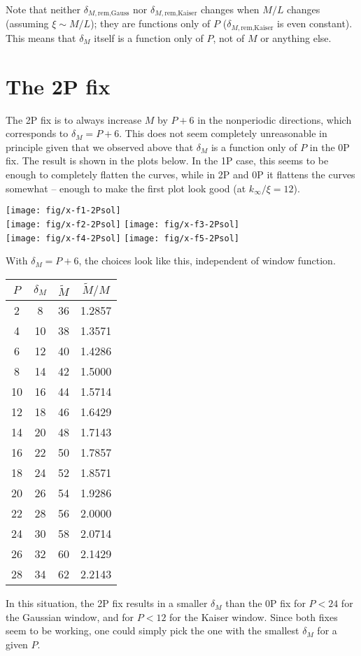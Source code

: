 \documentclass[a4paper,10pt]{article}
\begin{document}
Note that neither $\delta_{M,\text{rem,Gauss}}$ nor
$\delta_{M,\text{rem,Kaiser}}$ changes when $M/L$ changes
(assuming $\xi \sim M/L$); they are functions only of $P$
($\delta_{M,\text{rem,Kaiser}}$ is even constant). This means
that $\delta_M$ itself is a function only of $P$, not of $M$ or
anything else.

\section{The 2P fix}

The 2P fix is to always increase $M$ by $P+6$ in the nonperiodic
directions, which corresponds to $\delta_M = P+6$. This does not
seem completely unreasonable in principle given that we observed
above that $\delta_M$ is a function only of $P$ in the 0P fix.
The result is shown in the plots below. In the 1P case, this
seems to be enough to completely flatten the curves, while in 2P
and 0P it flattens the curves somewhat -- enough to make the
first plot look good (at $k_\infty/\xi=12$).

{\noindent\centering
\texttt{[image: fig/x-f1-2Psol]}\\%
\texttt{[image: fig/x-f2-2Psol]}%
\texttt{[image: fig/x-f3-2Psol]}\\%
\texttt{[image: fig/x-f4-2Psol]}%
\texttt{[image: fig/x-f5-2Psol]}}

With $\delta_M=P+6$, the choices look like this, independent of
window function.
\begin{center}
  \begin{tabular}{cccc}
    \toprule
    $P$ & $\delta_M$ & $\tilde{M}$ & $\tilde{M}/M$ \\
    \midrule
     2 &  8 & 36 & 1.2857 \\
     4 & 10 & 38 & 1.3571 \\
     6 & 12 & 40 & 1.4286 \\
     8 & 14 & 42 & 1.5000 \\
    10 & 16 & 44 & 1.5714 \\
    12 & 18 & 46 & 1.6429 \\
    14 & 20 & 48 & 1.7143 \\
    16 & 22 & 50 & 1.7857 \\
    18 & 24 & 52 & 1.8571 \\
    20 & 26 & 54 & 1.9286 \\
    22 & 28 & 56 & 2.0000 \\
    24 & 30 & 58 & 2.0714 \\
    26 & 32 & 60 & 2.1429 \\
    28 & 34 & 62 & 2.2143 \\
    \bottomrule
  \end{tabular}
\end{center}
In this situation, the 2P fix results in a smaller $\delta_M$
than the 0P fix for $P < 24$ for the Gaussian window, and for $P
< 12$ for the Kaiser window. Since both fixes seem to be working,
one could simply pick the one with the smallest $\delta_M$ for a
given $P$.
\end{document}
